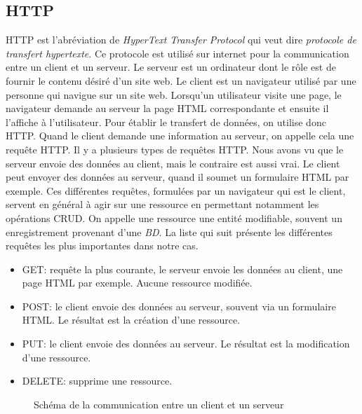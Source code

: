 \documentclass[letterpaper,10pt,oneside]{sphinxmanual}
\begin{document}
\subsection{HTTP}
\label{restless:http}
HTTP est l'abréviation de \emph{HyperText Transfer Protocol} qui veut dire \emph{protocole de transfert hypertexte}. Ce protocole est utilisé sur internet pour la communication entre un client et un serveur. Le serveur est un ordinateur dont le rôle est de fournir le contenu désiré d'un site web. Le client est un navigateur utilisé par une personne qui navigue sur un site web. Lorsqu'un utilisateur visite une page, le navigateur demande au serveur la page HTML correspondante et ensuite il l'affiche à l'utilisateur. Pour établir le transfert de données, on utilise donc HTTP. Quand le client demande une information au serveur, on appelle cela une requête HTTP. Il y a plusieurs types de requêtes HTTP. Nous avons vu que le serveur envoie des données au client, mais le contraire est aussi vrai. Le client peut envoyer des données au serveur, quand il soumet un formulaire HTML par exemple. Ces différentes requêtes, formulées par un navigateur qui est le client, servent en général à agir sur une ressource en permettant notamment les opérations CRUD. On appelle une ressource une entité modifiable, souvent un enregistrement provenant d'une \emph{BD}. La liste qui suit présente les différentes requêtes les plus importantes dans notre cas.
\begin{itemize}
\item {} 
GET: requête la plus courante, le serveur envoie les données au client, une page HTML par exemple. Aucune ressource modifiée.

\item {} 
POST: le client envoie des données au serveur, souvent via un formulaire HTML. Le résultat est la création d'une ressource.

\item {} 
PUT: le client envoie des données au serveur. Le résultat est la modification d'une ressource.

\item {} 
DELETE: supprime une ressource.

\end{itemize}
\begin{figure}[htbp]
\centering
\capstart

\caption{Schéma de la communication entre un client et un serveur}\end{figure}
\end{document}
